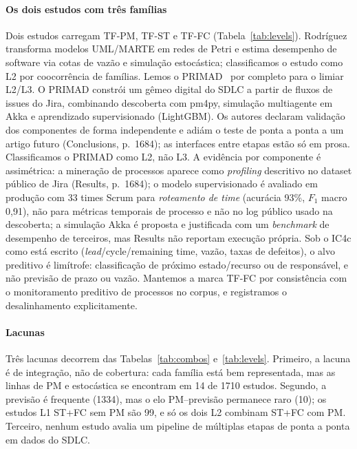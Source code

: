 \documentclass[preprint,12pt,authoryear=false]{elsarticle}
\newcommand{\PM}{TF-PM}
\newcommand{\ST}{TF-ST}
\newcommand{\FC}{TF-FC}
\begin{document}
\paragraph{Os dois estudos com três famílias}
Dois estudos carregam \PM{}, \ST{} e \FC{} (Tabela~\ref{tab:levels}). Rodr{\'i}guez~\cite{rodriguez2017} transforma modelos UML/MARTE em redes de Petri e estima desempenho de software via cotas de vazão e simulação estocástica; classificamos o estudo como L2 por coocorrência de famílias. Lemos o PRIMAD~\cite{guinea2025} por completo para o limiar L2/L3. O PRIMAD constrói um gêmeo digital do SDLC a partir de fluxos de issues do Jira, combinando descoberta com pm4py, simulação multiagente em Akka e aprendizado supervisionado (LightGBM). Os autores declaram validação dos componentes de forma independente e adiám o teste de ponta a ponta a um artigo futuro (Conclusions, p.~1684); as interfaces entre etapas estão só em prosa. Classificamos o PRIMAD como L2, não L3. A evidência por componente é assimétrica: a mineração de processos aparece como \emph{profiling} descritivo no dataset público de Jira (Results, p.~1684); o modelo supervisionado é avaliado em produção com 33 times Scrum para \emph{roteamento de time} (acurácia 93\%, $F_1$ macro 0,91), não para métricas temporais de processo e não no log público usado na descoberta; a simulação Akka é proposta e justificada com um \emph{benchmark} de desempenho de terceiros, mas Results não reportam execução própria. Sob o IC4c como está escrito (\emph{lead}/cycle/remaining time, vazão, taxas de defeitos), o alvo preditivo é limítrofe: classificação de próximo estado/recurso ou de responsável, e não previsão de prazo ou vazão. Mantemos a marca \FC{} por consistência com o monitoramento preditivo de processos no corpus, e registramos o desalinhamento explicitamente.

\paragraph{Lacunas}
Três lacunas decorrem das Tabelas~\ref{tab:combos} e~\ref{tab:levels}. Primeiro, a lacuna é de integração, não de cobertura: cada família está bem representada, mas as linhas de PM e estocástica se encontram em 14 de 1710 estudos. Segundo, a previsão é frequente (1334), mas o elo PM--previsão permanece raro (10); os estudos L1 ST+FC sem PM são 99, e só os dois L2 combinam ST+FC com PM. Terceiro, nenhum estudo avalia um pipeline de múltiplas etapas de ponta a ponta em dados do SDLC.

\end{document}
